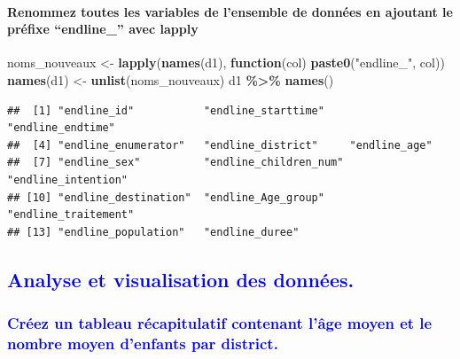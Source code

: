 \documentclass[
]{article}
\newenvironment{Shaded}{\begin{snugshade}}{\end{snugshade}}
\newcommand{\ControlFlowTok}[1]{\textcolor[rgb]{0.13,0.29,0.53}{\textbf{#1}}}
\newcommand{\FunctionTok}[1]{\textcolor[rgb]{0.13,0.29,0.53}{\textbf{#1}}}
\newcommand{\NormalTok}[1]{#1}
\newcommand{\OtherTok}[1]{\textcolor[rgb]{0.56,0.35,0.01}{#1}}
\newcommand{\SpecialCharTok}[1]{\textcolor[rgb]{0.81,0.36,0.00}{\textbf{#1}}}
\newcommand{\StringTok}[1]{\textcolor[rgb]{0.31,0.60,0.02}{#1}}
\begin{document}
\hfill\break

\hypertarget{renommez-toutes-les-variables-de-lensemble-de-donnuxe9es-en-ajoutant-le-pruxe9fixe-endline_-avec-lapply}{%
\paragraph{Renommez toutes les variables de l'ensemble de données en
ajoutant le préfixe ``endline\_'' avec
lapply}\label{renommez-toutes-les-variables-de-lensemble-de-donnuxe9es-en-ajoutant-le-pruxe9fixe-endline_-avec-lapply}}

\hfill\break

\begin{Shaded}
\begin{Highlighting}[]
\NormalTok{noms\_nouveaux }\OtherTok{\textless{}{-}} \FunctionTok{lapply}\NormalTok{(}\FunctionTok{names}\NormalTok{(d1), }\ControlFlowTok{function}\NormalTok{(col) }\FunctionTok{paste0}\NormalTok{(}\StringTok{"endline\_"}\NormalTok{, col))}
\FunctionTok{names}\NormalTok{(d1) }\OtherTok{\textless{}{-}} \FunctionTok{unlist}\NormalTok{(noms\_nouveaux)}
\NormalTok{d1 }\SpecialCharTok{\%\textgreater{}\%}
\FunctionTok{names}\NormalTok{()}
\end{Highlighting}
\end{Shaded}

\begin{verbatim}
##  [1] "endline_id"           "endline_starttime"    "endline_endtime"     
##  [4] "endline_enumerator"   "endline_district"     "endline_age"         
##  [7] "endline_sex"          "endline_children_num" "endline_intention"   
## [10] "endline_destination"  "endline_Age_group"    "endline_traitement"  
## [13] "endline_population"   "endline_duree"
\end{verbatim}

\hfill\break

\textcolor{blue}{\subsection{Analyse et visualisation des données.}}

\textcolor{blue}{\subsubsection{Créez un tableau récapitulatif contenant l'âge moyen et le nombre moyen d'enfants par district.}}

\hfill\break
\end{document}
